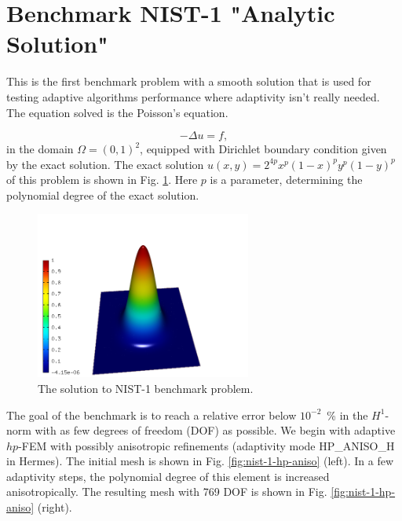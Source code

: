 \section{Benchmark NIST-1 "Analytic Solution"}
\label{sec:bench-1}

This is the first benchmark problem with a smooth solution
that is used for testing adaptive algorithms performance
where adaptivity isn't really needed.
The equation solved is the Poisson's equation.

\begin{equation} \label{poisson}
-\Delta u = f,
\end{equation}
in the domain $\Omega = (0, 1)^2$, equipped with Dirichlet
boundary condition given by the exact solution.
The exact solution $u(x, y) = 2^{4p}x^{p}(1-x)^{p}y^{p}(1-y)^{p}$
of this problem is shown in Fig. \ref{fig:sln-nist01}.
Here $p$ is a parameter, determining the polynomial degree of the exact solution.

\begin{figure}[!ht]
\centering
\includegraphics[height=5.5cm]{nist/nist-1/solution.png}
\caption{The solution to NIST-1 benchmark problem.}
\label{fig:sln-nist01}
\end{figure}
\noindent
The goal of the benchmark is to reach a relative error below
$10^{-2}$~\% in the $H^1$-norm with as few degrees of freedom (DOF)
as possible.
We begin with adaptive $hp$-FEM with possibly anisotropic refinements (adaptivity mode
HP\_ANISO\_H in {\sc Hermes}). The initial mesh is shown in Fig. \ref{fig:nist-1-hp-aniso} (left).
In a few adaptivity steps, the polynomial degree of this element is increased
anisotropically.
The resulting mesh with 769 DOF is shown in Fig. \ref{fig:nist-1-hp-aniso} (right).

